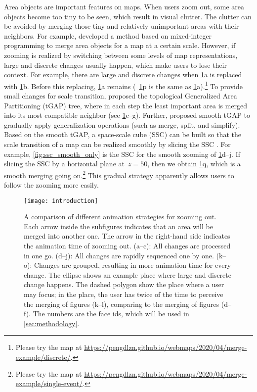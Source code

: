\documentclass[ijgi,article,submit,moreauthors,pdftex]{Definitions/mdpi}
\begin{document}
Area objects are important features on maps. 
When users zoom out,
some area objects become too tiny to be seen,
which result in visual clutter.
The clutter can be avoided by merging 
those tiny and relatively unimportant areas with their neighbors.
For example, \citet{haunert2008f} developed a method based on
mixed-integer programming to merge area objects
for a map at a certain scale.
However, if zooming is realized by switching between
some levels of map representations, 
large and discrete changes usually happen, 
which make users to lose their context.
For example, there are large and discrete changes when
\fig\ref{fig:intro}a is replaced with \fig\ref{fig:intro}b.
Before this replacing, \fig\ref{fig:intro}a remains
(\eg~\fig\ref{fig:intro}p is the same as \fig\ref{fig:intro}a).\footnote{%
Please try the map at
\url{https://pengdlzn.github.io/webmaps/2020/04/merge-example/discrete/}.}
To provide small changes for scale transition, 
\citet{vanOosterom2005} proposed 
the topological Generalized Area Partitioning (tGAP) tree,
where in each step the least important area is merged into
its most compatible neighbor 
(see \figs\ref{fig:intro}c--g).
Further, \citet{vanOosterom2014Support} proposed smooth tGAP
to gradually apply generalization operations 
(such as merge, split, and simplify).
Based on the smooth tGAP, a space-scale cube (SSC) can be built so that 
the scale transition of a map can be realized smoothly
by slicing the SSC \citep[see][]{Meijers2020Web}.
For example, \fig\ref{fig:ssc_smooth_only} is the SSC 
for the smooth zooming of \figs\ref{fig:intro}d--j.
If slicing the SSC by a horizontal plane at~$z=50$,
then we obtain \fig\ref{fig:intro}q, 
which is a smooth merging going on.\footnote{%
Please try the map at
\url{https://pengdlzn.github.io/webmaps/2020/04/merge-example/single-event/}.}
This gradual strategy apparently allows users 
to follow the zooming more easily.


\begin{figure}[tb]
\centering
\texttt{[image: introduction]}
\caption{A comparison of different animation strategies for zooming out.
Each arrow inside the subfigures indicates that 
an area will be merged into another one.
The arrow in the right-hand side indicates the animation time of zooming out.
%
(a--c): All changes are processed in one go.
(d--j): All changes are rapidly sequenced one by one.
(k--o): Changes are grouped, resulting in more animation time for every change.
%
The ellipse shows an example place where large and discrete change happens.
The dashed polygon show the place where a user may focus;
in the place, the user has twice of the time to perceive the merging
of figures (k--l),
comparing to the merging of figures (d--f).
The numbers are the face ids, which will be used in \sect\ref{sec:methodology}.
}
\label{fig:intro}
\end{figure}
\end{document}
